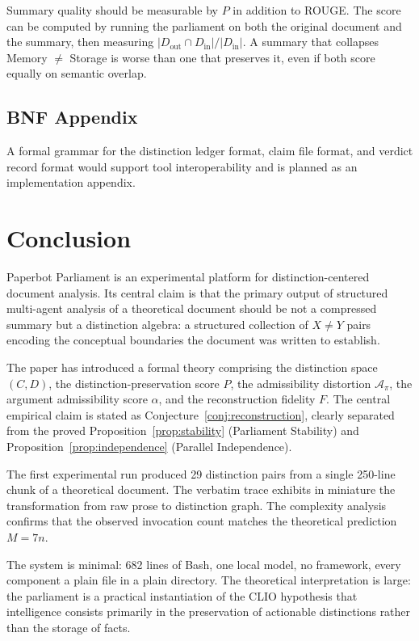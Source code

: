 \documentclass[12pt, a4paper]{article}
\theoremstyle{principle}
\theoremstyle{definition}
\begin{document}
Summary quality should be measurable by $P$ in addition to ROUGE. The score can be
computed by running the parliament on both the original document and the summary,
then measuring $|D_\mathrm{out} \cap D_\mathrm{in}| / |D_\mathrm{in}|$. A summary
that collapses Memory $\neq$ Storage is worse than one that preserves it, even if
both score equally on semantic overlap.

\subsection{BNF Appendix}

A formal grammar for the distinction ledger format, claim file format, and verdict
record format would support tool interoperability and is planned as an implementation
appendix.

\section{Conclusion}

Paperbot Parliament is an experimental platform for distinction-centered document
analysis. Its central claim is that the primary output of structured multi-agent
analysis of a theoretical document should be not a compressed summary but a
distinction algebra: a structured collection of $X \neq Y$ pairs encoding the
conceptual boundaries the document was written to establish.

The paper has introduced a formal theory comprising the distinction space $(C, D)$,
the distinction-preservation score $P$, the admissibility distortion
$\mathcal{A}_\pi$, the argument admissibility score $\alpha$, and the
reconstruction fidelity $F$. The central empirical claim is stated as
Conjecture~\ref{conj:reconstruction}, clearly separated from the proved
Proposition~\ref{prop:stability} (Parliament Stability) and
Proposition~\ref{prop:independence} (Parallel Independence).

The first experimental run produced 29 distinction pairs from a single 250-line
chunk of a theoretical document. The verbatim trace exhibits in miniature the
transformation from raw prose to distinction graph. The complexity analysis confirms
that the observed invocation count matches the theoretical prediction $M = 7n$.

The system is minimal: 682 lines of Bash, one local model, no framework, every
component a plain file in a plain directory. The theoretical interpretation is
large: the parliament is a practical instantiation of the CLIO hypothesis that
intelligence consists primarily in the preservation of actionable distinctions
rather than the storage of facts.
\end{document}
